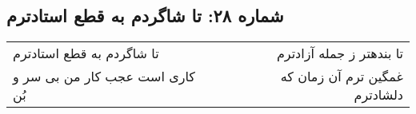 \begin{center}
\section*{شماره ۲۸: تا شاگردم به قطع استادترم}
\label{sec:028}
\begin{longtable}{l p{0.5cm} r}
تا شاگردم به قطع استادترم
&&
تا بندهتر ز جمله آزادترم
\\
کاری است عجب کار من بی سر و بُن
&&
غمگین ترم آن زمان که دلشادترم
\\
\end{longtable}
\end{center}
